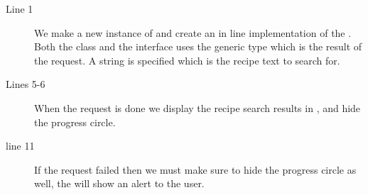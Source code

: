 \begin{description}
\item[Line 1] We make a new instance of  and create an in line implementation of the . Both the class and the interface uses the generic type  which is the result of the request. A  string is specified which is the recipe text to search for.
\item[Lines 5-6] When the request is done we display the recipe search results in , and hide the progress circle.
\item[line 11] If the request failed then we must make sure to hide the progress circle as well, the  will show an alert to the user.
\end{description}
